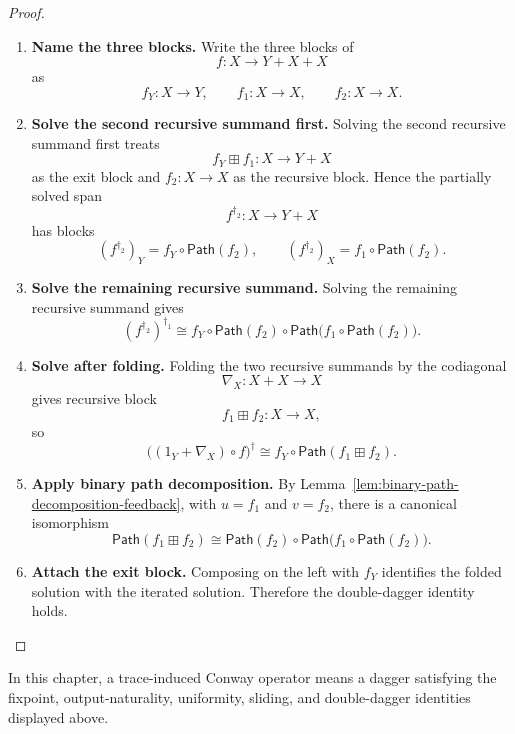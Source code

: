 \begin{proof}
\begin{enumerate}
  \item \textbf{Name the three blocks.}
  Write the three blocks of
  \[
    f:X\to Y+X+X
  \]
  as
  \[
    f_Y:X\to Y,
    \qquad
    f_1:X\to X,
    \qquad
    f_2:X\to X.
  \]

  \item \textbf{Solve the second recursive summand first.}
  Solving the second recursive summand first treats
  \[
    f_Y\boxplus f_1:X\to Y+X
  \]
  as the exit block and \(f_2:X\to X\) as the recursive block. Hence the
  partially solved span
  \[
    f^{\dagger_2}:X\to Y+X
  \]
  has blocks
  \[
    (f^{\dagger_2})_Y
    =
    f_Y\circ\mathsf{Path}(f_2),
    \qquad
    (f^{\dagger_2})_X
    =
    f_1\circ\mathsf{Path}(f_2).
  \]

  \item \textbf{Solve the remaining recursive summand.}
  Solving the remaining recursive summand gives
  \[
    (f^{\dagger_2})^{\dagger_1}
    \cong
    f_Y\circ
    \mathsf{Path}(f_2)
    \circ
    \mathsf{Path}\bigl(f_1\circ\mathsf{Path}(f_2)\bigr).
  \]

  \item \textbf{Solve after folding.}
  Folding the two recursive summands by the codiagonal
  \[
    \nabla_X:X+X\to X
  \]
  gives recursive block
  \[
    f_1\boxplus f_2:X\to X,
  \]
  so
  \[
    \bigl((1_Y+\nabla_X)\circ f\bigr)^\dagger
    \cong
    f_Y\circ\mathsf{Path}(f_1\boxplus f_2).
  \]

  \item \textbf{Apply binary path decomposition.}
  By Lemma~\ref{lem:binary-path-decomposition-feedback}, with \(u=f_1\) and
  \(v=f_2\), there is a canonical isomorphism
  \[
    \mathsf{Path}(f_1\boxplus f_2)
    \cong
    \mathsf{Path}(f_2)
    \circ
    \mathsf{Path}\bigl(f_1\circ\mathsf{Path}(f_2)\bigr).
  \]

  \item \textbf{Attach the exit block.}
  Composing on the left with \(f_Y\) identifies the folded solution with the
  iterated solution. Therefore the double-dagger identity holds.
\end{enumerate}
\end{proof}

In this chapter, a trace-induced Conway operator means a dagger satisfying the
fixpoint, output-naturality, uniformity, sliding, and double-dagger identities
displayed above.

